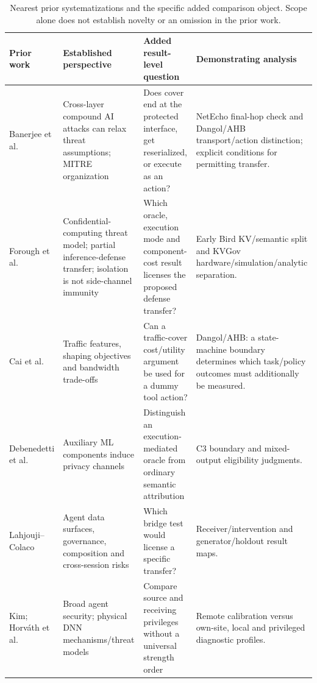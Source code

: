 \begin{table}[t]\centering\footnotesize
\caption{Nearest prior systematizations and the specific added comparison object. Scope alone does not establish novelty or an omission in the prior work.}\label{tab:related-sok-matrix}
\begin{tabularx}{\textwidth}{@{}p{}YYY@{}}\toprule
Prior work & Established perspective & Added result-level question & Demonstrating analysis\\\midrule
Banerjee et al. \cite{banerjee2024compound} & Cross-layer compound AI attacks can relax threat assumptions; MITRE organization & Does cover end at the protected interface, get reserialized, or execute as an action? & NetEcho final-hop check and Dangol/AHB transport/action distinction; explicit conditions for permitting transfer.\\
Forough et al. \cite{forough2026secrets} & Confidential-computing threat model; partial inference-defense transfer; isolation is not side-channel immunity & Which oracle, execution mode and component-cost result licenses the proposed defense transfer? & Early Bird KV/semantic split and KVGov hardware/simulation/analytic separation.\\
Cai et al. \cite{cai2014systematic} & Traffic features, shaping objectives and bandwidth trade-offs & Can a traffic-cover cost/utility argument be used for a dummy tool action? & Dangol/AHB: a state-machine boundary determines which task/policy outcomes must additionally be measured.\\
Debenedetti et al. \cite{debenedetti2024privacy} & Auxiliary ML components induce privacy channels & Distinguish an execution-mediated oracle from ordinary semantic attribution & C3 boundary and mixed-output eligibility judgments.\\
Lahjouji--Colaco \cite{lahjouji2026datacentric} & Agent data surfaces, governance, composition and cross-session risks & Which bridge test would license a specific transfer? & Receiver/intervention and generator/holdout result maps.\\
Kim; Horv\'ath et al. \cite{kim2026agenticsok,horvath2024physical} & Broad agent security; physical DNN mechanisms/threat models & Compare source and receiving privileges without a universal strength order & Remote calibration versus own-site, local and privileged diagnostic profiles.\\\bottomrule
\end{tabularx}\end{table}
